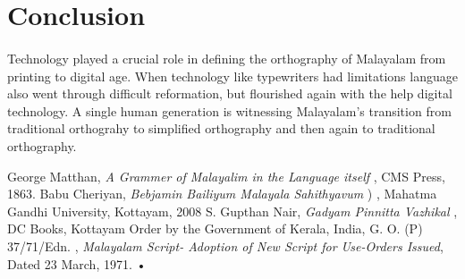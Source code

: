 \documentclass[10pt]{article}
\begin{document}
\section{Conclusion}

\paragraph{}
Technology played a crucial role in defining the orthography of Malayalam from printing to digital age. When technology like typewriters had limitations language also went through difficult reformation, but flourished again with the help digital technology. A single human generation is witnessing Malayalam's transition from traditional orthograhy to simplified orthography and then again to traditional orthography.

\begin{thebibliography}{9}
 George Matthan, \textit{A Grammer of Malayalim in the Language itself }, CMS Press, 1863.
 Babu Cheriyan, \textit{Bebjamin Bailiyum Malayala Sahithyavum} {) }, Mahatma Gandhi University, Kottayam, 2008
 S. Gupthan Nair, \textit{Gadyam Pinnitta Vazhikal}{ }, DC Books, Kottayam
 Order by the Government of Kerala, India, G. O. (P) 37/71/Edn. , \textit{Malayalam Script- Adoption of New Script for Use-Orders Issued}, Dated 23 March, 1971.
•


\end{thebibliography}
\end{document}
